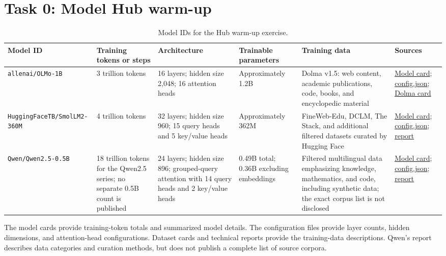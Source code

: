 \documentclass[10pt,a4paper]{article}
\begin{document}
\section{Task 0: Model Hub warm-up}

\begin{table}[ht]
\centering
\footnotesize
\begin{tabularx}{\textwidth}{@{}p{2.4cm}p{2.3cm}Yp{2.0cm}Yp{2.3cm}@{}}
\toprule
Model ID & Training tokens or steps & Architecture & Trainable parameters & Training data & Sources \\
\midrule
\texttt{allenai/OLMo-1B}
& 3 trillion tokens
& 16 layers; hidden size 2,048; 16 attention heads
& Approximately 1.2B
& Dolma v1.5: web content, academic publications, code, books, and encyclopedic material
& \href{https://huggingface.co/allenai/OLMo-1B}{Model card};
  \href{https://huggingface.co/allenai/OLMo-1B/blob/main/config.json}{config.json};
  \href{https://huggingface.co/datasets/allenai/dolma}{Dolma card} \\
\addlinespace
\texttt{HuggingFaceTB/\allowbreak SmolLM2-360M}
& 4 trillion tokens
& 32 layers; hidden size 960; 15 query heads and 5 key/value heads
& Approximately 362M
& FineWeb-Edu, DCLM, The Stack, and additional filtered datasets curated by Hugging Face
& \href{https://huggingface.co/HuggingFaceTB/SmolLM2-360M}{Model card};
  \href{https://huggingface.co/HuggingFaceTB/SmolLM2-360M/blob/main/config.json}{config.json};
  \href{https://arxiv.org/abs/2502.02737}{report} \\
\addlinespace
\texttt{Qwen/\allowbreak Qwen2.5-0.5B}
& 18 trillion tokens for the Qwen2.5 series; no separate 0.5B count is published
& 24 layers; hidden size 896; grouped-query attention with 14 query heads and 2 key/value heads
& 0.49B total; 0.36B excluding embeddings
& Filtered multilingual data emphasizing knowledge, mathematics, and code, including synthetic data; the exact corpus list is not disclosed
& \href{https://huggingface.co/Qwen/Qwen2.5-0.5B}{Model card};
  \href{https://huggingface.co/Qwen/Qwen2.5-0.5B/blob/main/config.json}{config.json};
  \href{https://arxiv.org/abs/2412.15115}{report} \\
\bottomrule
\end{tabularx}
\caption{Model IDs for the Hub warm-up exercise.}
\label{tab:model-hub-warmup}
\end{table}

The model cards provide training-token totals and summarized model details.
The configuration files provide layer counts, hidden dimensions, and
attention-head configurations. Dataset cards and technical reports provide
the training-data descriptions. Qwen's report describes data categories and
curation methods, but does not publish a complete list of source corpora.
\end{document}
